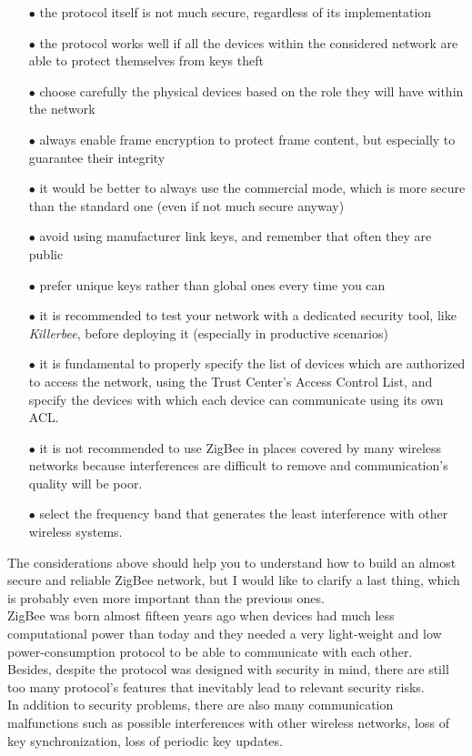\documentclass[12pt]{report}
\begin{document}
{\begin{itemize}
\setlength{\itemindent}{+4mm}
\item[$\bullet$] the protocol itself is not much secure, regardless of its implementation
\item[$\bullet$] the protocol works well if all the devices within the considered network are able to protect themselves from keys theft
\item[$\bullet$] choose carefully the physical devices based on the role they will have within the network
\item[$\bullet$] always enable frame encryption to protect frame content, but especially to guarantee their integrity
\item[$\bullet$] it would be better to always use the commercial mode, which is more secure than the standard one (even if not much secure anyway)
\item[$\bullet$] avoid using manufacturer link keys, and remember that often they are public
\item[$\bullet$] prefer unique keys rather than global ones every time you can
\item[$\bullet$] it is recommended to test your network with a dedicated security tool, like \emph{Killerbee}, before deploying it (especially in productive scenarios)
\item[$\bullet$] it is fundamental to properly specify the list of devices which are authorized to access the network, using the Trust Center's Access Control List, and specify the devices with which each device can communicate using its own ACL.
\item[$\bullet$] it is not recommended to use ZigBee in places covered by many wireless networks because interferences are difficult to remove and communication's quality will be poor.
\item[$\bullet$] select the frequency band that generates the least interference with other wireless systems.\\
\end{itemize}

The considerations above should help you to understand how to build an almost secure and reliable ZigBee network, but I would like to clarify a last thing, which is probably even more important than the previous ones.\\
ZigBee was born almost fifteen years ago when devices had much less computational power than today and they needed a very light-weight and low power-consumption protocol to be able to communicate with each other.\\Besides, despite the protocol was designed with security in mind, there are still too many protocol's features that inevitably lead to relevant security risks.\\
In addition to security problems, there are also many communication malfunctions such as possible interferences with other wireless networks, loss of key synchronization, loss of periodic key updates.\\

}
\end{document}
